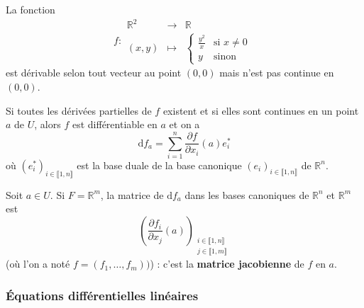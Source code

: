 	\begin{cexample}
		La fonction
		\[
			f :
			\begin{array}{ccc}
				\mathbb{R}^2 &\rightarrow& \mathbb{R} \\
				(x,y) &\mapsto& \begin{cases}
					\frac{y^2}{x} &\text{si } x \neq 0 \\
					y &\text{sinon}
				\end{cases}
			\end{array}
		\]
		est dérivable selon tout vecteur au point $(0,0)$ mais n'est pas continue en $(0,0)$.
	\end{cexample}

	\begin{theorem}
		Si toutes les dérivées partielles de $f$ existent et si elles sont continues en un point $a$ de $U$, alors $f$ est différentiable en $a$ et on a
		\[ \mathrm{d}f_a = \sum_{i=1}^n \frac{\partial f}{\partial x_i}(a) e_i^* \]
		où $(e_i^*)_{i \in \llbracket 1, n \rrbracket}$ est la base duale de la base canonique $(e_i)_{i \in \llbracket 1, n \rrbracket}$ de $\mathbb{R}^n$.
	\end{theorem}

	\begin{application}
		Soit $a \in U$. Si $F = \mathbb{R}^m$, la matrice de $\mathrm{d}f_a$ dans les bases canoniques de $\mathbb{R}^n$ et $\mathbb{R}^m$ est
		\[ \left(\frac{\partial f_i}{\partial x_j}(a)\right)_{\substack{i \in \llbracket 1, n \rrbracket \\ j \in \llbracket 1, m \rrbracket}} \]
		(où l'on a noté $f = (f_1, \dots, f_m))$) : c'est la \textbf{matrice jacobienne} de $f$ en $a$.
	\end{application}

	\subsubsection{Équations différentielles linéaires}



